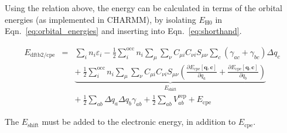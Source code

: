 \documentclass{article}
\numberwithin{equation}{section}
\begin{document}
Using the relation above, the energy can be calculated in terms of the orbital energies (as implemented in CHARMM), by isolating $E_\mathrm{H0}$ in Eqn.~\ref{eq:orbital_energies} and inserting into Eqn.~\ref{eq:shorthand}.

\begin{eqnarray}
    E_\mathrm{{dftb2/cpe}}
    &=& \sum_i n_i \varepsilon_i 
    - \frac{1}{2} \sum_i^\mathrm{occ} n_i \sum_{\mu} \sum_{\nu}  C_{\mu i} C_{\nu i} S_{\mu\nu} \sum_c \left( \gamma_{ac} + \gamma_{bc} \right)\Delta q_c \nonumber\\
    && \underbrace{+\ \frac{1}{2} \sum_i^\mathrm{occ} n_i \sum_{\mu} \sum_{\nu}  C_{\mu i} C_{\nu i} S_{\mu\nu} \left(
    \frac{\partial E_{\mathrm{cpe}}\left[\mathbf{q}, \mathbf{c}\right]}{\partial q_a} +
    \frac{\partial E_{\mathrm{cpe}}\left[\mathbf{q}, \mathbf{c}\right]}{\partial q_b} \right)}_{E_\mathrm{shift}} \nonumber\\
    && +\ \frac{1}{2} \sum_{ab} \Delta q_a \Delta q_b \gamma_{ab}
    + \frac{1}{2} \sum_{ab} V^\mathrm{rep}_{ab} + E_{\mathrm{cpe}}
\end{eqnarray}

The $E_\mathrm{shift}$ must be added to the electronic energy, in addition to $E_\mathrm{cpe}$.




\clearpage
\end{document}

